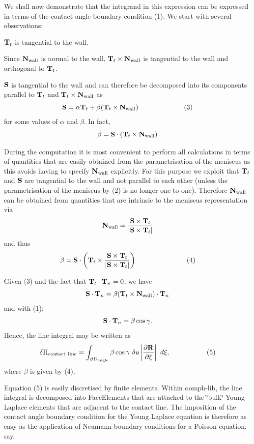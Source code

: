 We shall now demonstrate that the integrand in this expression can be expressed in terms of the contact angle boundary condition (1). We start with several observations\+:
\begin{DoxyEnumerate}
\item ${\bf T}_t$ is tangential to the wall. ~\newline
~\newline

\item Since ${\bf N}_{\rm wall}$ is normal to the wall, ${\bf T}_t \times {\bf N}_{\rm wall}$ is tangential to the wall and orthogonal to ${\bf T}_t$. ~\newline
~\newline

\item ${\bf S}$ is tangential to the wall and can therefore be decomposed into its components parallel to $ {\bf T}_t $ and ${\bf T}_t \times {\bf N}_{\rm wall} $ as \[ {\bf S} = \alpha {\bf T}_t + \beta ( {\bf T}_t \times {\bf N}_{\rm wall} ) \ \ \ \ \ \ \ \ \ \ \ \ \ \ \ \ \ \ \ \ (3) \] for some values of $\alpha$ and $\beta$. In fact, \[ \beta = {\bf S} \cdot ( {\bf T}_t \times {\bf N}_{\rm wall} ) \]
\item During the computation it is most convenient to perform all calculations in terms of quantities that are easily obtained from the parametrisation of the meniscus as this avoids having to specify ${\bf N}_{\rm wall}$ explicitly. For this purpose we exploit that ${\bf T}_t$ and ${\bf S}$ are tangential to the wall and not parallel to each other (unless the parametrisation of the meniscus by (2) is no longer one-\/to-\/one). Therefore ${\bf N}_{\rm wall}$ can be obtained from quantities that are intrinsic to the meniscus representation via ~\newline
~\newline
 \[ {\bf N}_{\rm wall} = \frac{ {\bf S} \times {\bf T}_t } {|{\bf S} \times {\bf T}_t|} \] and thus \[ \beta = {\bf S} \cdot \left( {\bf T}_t \times \frac{ {\bf S} \times {\bf T}_t } {|{\bf S} \times {\bf T}_t|} \right) \ \ \ \ \ \ \ \ \ \ \ \ \ \ \ \ \ \ \ \ \ \ (4) \]
\item Given (3) and the fact that ${\bf T}_t \cdot {\bf T}_n =0$, we have ~\newline
~\newline
 \[ {\bf S} \cdot {\bf T}_n = \beta ( {\bf T}_t \times {\bf N}_{\rm wall} ) \cdot {\bf T}_n \] and with (1)\+: \[ {\bf S} \cdot {\bf T}_n = \beta \cos \gamma. \] Hence, the line integral may be written as \[ \delta \Pi_{\rm contact\ line} = \int_{\partial D_{\rm angle}} \beta \cos \gamma \ \delta u \left| \frac{\partial {\bf R}}{\partial \xi}\right| \ d\xi, \ \ \ \ \ \ \ \ \ \ \ \ \ \ \ \ (5) \] where $ \beta $ is given by (4).
\end{DoxyEnumerate}Equation (5) is easily discretised by finite elements. Within {\ttfamily oomph-\/lib}, the line integral is decomposed into {\ttfamily Face\+Elements} that are attached to the \char`\"{}bulk\char`\"{} Young-\/\+Laplace elements that are adjacent to the contact line. The imposition of the contact angle boundary condition for the Young Laplace equation is therefore as easy as the application of Neumann boundary conditions for a Poisson equation, say.
